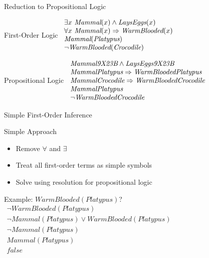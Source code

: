 \documentclass[14pt]{beamer}
\begin{document}
\begin{frame}{Reduction to Propositional Logic}
\begin{block}{First-Order Logic}
$
\begin{array}{l}
\exists x\ \textit{Mammal}(x) \land \textit{LaysEggs}(x) \\
\forall x\ \textit{Mammal}(x) \Rightarrow \textit{WarmBlooded}(x) \\
\textit{Mammal}(\textit{Platypus}) \\
\lnot \textit{WarmBlooded}(\textit{Crocodile})
\end{array}
$
\end{block}
\pause
\begin{block}{Propositional Logic}
$
\begin{array}{l}
\textit{Mammal9X23B} \land \textit{LaysEggs9X23B} \\
\textit{MammalPlatypus} \Rightarrow \textit{WarmBloodedPlatypus} \\
\textit{MammalCrocodile} \Rightarrow \textit{WarmBloodedCrocodile} \\
\textit{MammalPlatypus} \\
\lnot \textit{WarmBloodedCrocodile}
\end{array}
$
\end{block}
\end{frame}

\begin{frame}{Simple First-Order Inference}
	\begin{block}{Simple Approach}
		\begin{itemize}
			\item Remove $\forall$ and $\exists$
			\item Treat all first-order terms as simple symbols
			\item Solve using resolution for propositional logic
		\end{itemize}
	\end{block}
	\pause
	\begin{block}{Example: $\textit{WarmBlooded}(\textit{Platypus})$?}
		$
		\begin{array}{l}
			\lnot\textit{WarmBlooded}(\textit{Platypus}) \\
			\lnot\textit{Mammal}(\textit{Platypus}) \lor \textit{WarmBlooded}(\textit{Platypus}) \\
			\hline
			\lnot\textit{Mammal}(\textit{Platypus}) \\
			\textit{Mammal}(\textit{Platypus}) \\
			\hline
			\textit{false}
		\end{array}
		$
	\end{block}
\end{frame}
\end{document}

